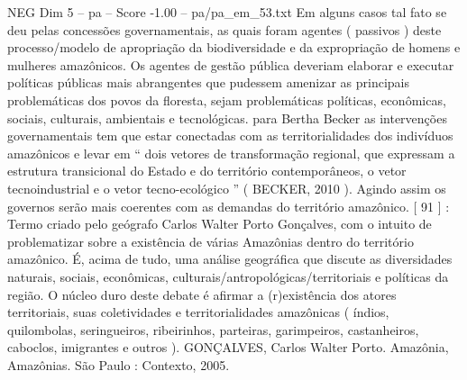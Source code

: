 \begin{textsample}{NEG Dim 5 – pa – Score -1.00 – pa/pa\_em\_53.txt}
Em alguns casos tal fato se deu pelas concessões governamentais, as quais foram agentes ( passivos ) deste processo/modelo de apropriação da biodiversidade e da expropriação de homens e mulheres amazônicos.
Os agentes de gestão pública deveriam elaborar e executar políticas públicas mais abrangentes que pudessem amenizar as principais problemáticas dos povos da floresta, sejam problemáticas políticas, econômicas, sociais, culturais, ambientais e tecnológicas. para Bertha Becker as intervenções governamentais tem que estar conectadas com as territorialidades dos indivíduos amazônicos e levar em “ dois vetores de transformação regional, que expressam a estrutura transicional do Estado e do território contemporâneos, o vetor tecnoindustrial e o vetor tecno-ecológico ” ( BECKER, 2010 ).
Agindo assim os governos serão mais coerentes com as demandas do território amazônico. [ 91 ] : Termo criado pelo geógrafo Carlos Walter Porto Gonçalves, com o intuito de problematizar sobre a existência de várias Amazônias dentro do território amazônico.
É, acima de tudo, uma análise geográfica que discute as diversidades naturais, sociais, econômicas, culturais/antropológicas/territoriais e políticas da região.
O núcleo duro deste debate é afirmar a (r)existência dos atores territoriais, suas coletividades e territorialidades amazônicas ( índios, quilombolas, seringueiros, ribeirinhos, parteiras, garimpeiros, castanheiros, caboclos, imigrantes e outros ).
GONÇALVES, Carlos Walter Porto.
Amazônia, Amazônias.
São Paulo : Contexto, 2005.

\end{textsample}
